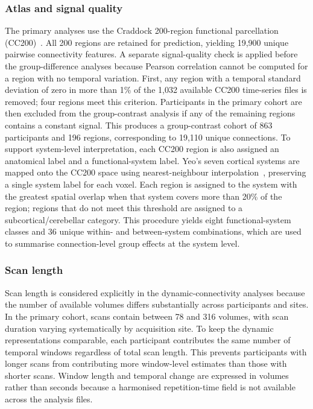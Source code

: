 \subsubsection{Atlas and signal quality}
\label{subsubsec:atlas-signal-quality}

The primary analyses use the Craddock 200-region functional parcellation (CC200)~\citep{Craddocketal2012}. All 200 regions are retained for prediction, yielding 19,900 unique pairwise connectivity features. A separate signal-quality check is applied before the group-difference analyses because Pearson correlation cannot be computed for a region with no temporal variation. First, any region with a temporal standard deviation of zero in more than 1\% of the 1,032 available CC200 time-series files is removed; four regions meet this criterion. Participants in the primary cohort are then excluded from the group-contrast analysis if any of the remaining regions contains a constant signal. This produces a group-contrast cohort of 863 participants and 196 regions, corresponding to 19,110 unique connections. To support system-level interpretation, each CC200 region is also assigned an anatomical label and a functional-system label. Yeo's seven cortical systems are mapped onto the CC200 space using nearest-neighbour interpolation~\citep{Yeoetal2011}, preserving a single system label for each voxel. Each region is assigned to the system with the greatest spatial overlap when that system covers more than 20\% of the region; regions that do not meet this threshold are assigned to a subcortical/cerebellar category. This procedure yields eight functional-system classes and 36 unique within- and between-system combinations, which are used to summarise connection-level group effects at the system level.

\subsubsection{Scan length}
\label{subsubsec:scan-length}

Scan length is considered explicitly in the dynamic-connectivity analyses because the number of available volumes differs substantially across participants and sites. In the primary cohort, scans contain between 78 and 316 volumes, with scan duration varying systematically by acquisition site. To keep the dynamic representations comparable, each participant contributes the same number of temporal windows regardless of total scan length. This prevents participants with longer scans from contributing more window-level estimates than those with shorter scans. Window length and temporal change are expressed in volumes rather than seconds because a harmonised repetition-time field is not available across the analysis files.

